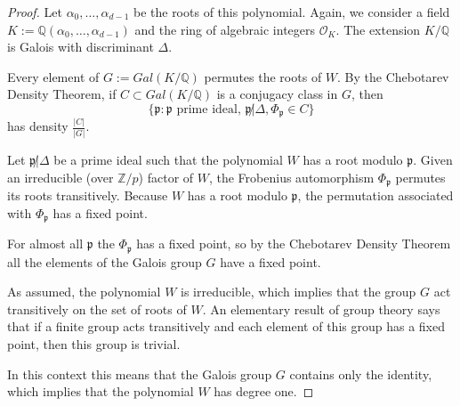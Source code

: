 \documentclass[preprint,12pt]{elsarticle}
\newcommand{\Z}{\mathbb{Z}}
\newcommand{\Q}{\mathbb{Q}}
\newcommand{\OO}{\mathcal{O}}
\newcommand{\alphas}{\alpha_0,\ldots,\alpha_{d-1}}
\newcommand{\pp}{\mathfrak{p} }
\begin{document}
\begin{proof}
    Let $\alphas$ be the roots of this polynomial. Again, we consider a field $K := \Q(\alphas)$ and the ring of algebraic integers $\OO_K$. The extension $K/\Q$ is Galois with discriminant $\Delta$.

    
    Every element of $G := Gal(K/\Q)$ permutes the roots of $W$.
    By the Chebotarev Density Theorem, if $C\subset Gal(K/\Q)$ is a conjugacy class in $G$, then 
    $$\{\pp: \pp \text{ prime ideal, } \pp \not| \Delta, \Phi_\pp \in C\}$$
    has density $\frac{|C|}{|G|}$.




    Let $\pp\not|\Delta$ be a prime ideal such that the polynomial $W$ has a root modulo $\pp$. Given an irreducible (over $\Z/p$) factor of $W$, the Frobenius automorphism $\Phi_\pp$ permutes  its roots  transitively. Because $W$ has a root modulo $\pp$, the permutation associated with $\Phi_\pp$ has a fixed point.

    For almost all $\pp$ the $\Phi_\pp$ has a fixed point, so by the Chebotarev Density Theorem all the elements of the Galois group $G$ have a fixed point. 

    As assumed, the polynomial $W$ is irreducible, which implies that the group $G$ act transitively on the set of roots of $W$. An elementary result of group theory says that if a finite group acts transitively and each element of this group has a fixed point, then this group is trivial. 

    In this context this means that the Galois group $G$ contains only the identity, which implies that the polynomial $W$ has degree one.


\end{proof}
\end{document}
